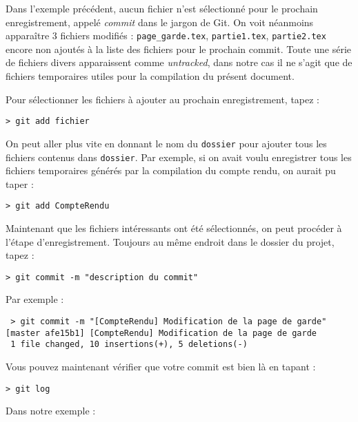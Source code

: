 \par Dans l'exemple précédent, aucun fichier n'est sélectionné pour le prochain enregistrement, appelé \emph{commit} dans le jargon de Git. On voit néanmoins apparaître 3 fichiers modifiés : \texttt{page\_garde.tex}, \texttt{partie1.tex}, \texttt{partie2.tex} encore non ajoutés à la liste des fichiers pour le prochain commit. Toute une série de fichiers divers apparaissent comme \emph{untracked}, dans notre cas il ne s'agit que de fichiers temporaires utiles pour la compilation du présent document. 

\par Pour sélectionner les fichiers à ajouter au prochain enregistrement, tapez :
\begin{verbatim}
> git add fichier 
\end{verbatim}

\par On peut aller plus vite en donnant le nom du \texttt{dossier} pour ajouter tous les fichiers contenus dans \texttt{dossier}. Par exemple, si on avait voulu enregistrer tous les fichiers temporaires générés par la compilation du compte rendu, on aurait pu taper :
\begin{verbatim}
> git add CompteRendu
\end{verbatim}

\par Maintenant que les fichiers intéressants ont été sélectionnés, on peut procéder à l'étape d'enregistrement. Toujours au même endroit dans le dossier du projet, tapez :
\begin{verbatim}
> git commit -m "description du commit"
\end{verbatim}

\par Par exemple :
\begin{verbatim}
 > git commit -m "[CompteRendu] Modification de la page de garde"
[master afe15b1] [CompteRendu] Modification de la page de garde
 1 file changed, 10 insertions(+), 5 deletions(-)
\end{verbatim}

\par Vous pouvez maintenant vérifier que votre commit est bien là en tapant :
\begin{verbatim}
> git log
\end{verbatim}

\par Dans notre exemple :

